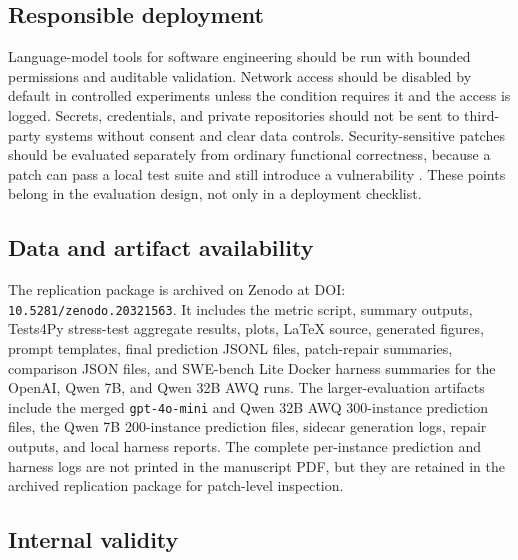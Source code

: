 \documentclass[preprint,12pt]{elsarticle}
\begin{document}
\subsection{Responsible deployment}

Language-model tools for software engineering should be run with bounded permissions and auditable validation. Network access should be disabled by default in controlled experiments unless the condition requires it and the access is logged. Secrets, credentials, and private repositories should not be sent to third-party systems without consent and clear data controls. Security-sensitive patches should be evaluated separately from ordinary functional correctness, because a patch can pass a local test suite and still introduce a vulnerability \cite{shen2025secrepobench}. These points belong in the evaluation design, not only in a deployment checklist.

\subsection{Data and artifact availability}

The replication package is archived on Zenodo at DOI: \texttt{10.5281/zenodo.20321563}. It includes the metric script, summary outputs, Tests4Py stress-test aggregate results, plots, LaTeX source, generated figures, prompt templates, final prediction JSONL files, patch-repair summaries, comparison JSON files, and SWE-bench Lite Docker harness summaries for the OpenAI, Qwen 7B, and Qwen 32B AWQ runs. The larger-evaluation artifacts include the merged \texttt{gpt-4o-mini} and Qwen 32B AWQ 300-instance prediction files, the Qwen 7B 200-instance prediction files, sidecar generation logs, repair outputs, and local harness reports. The complete per-instance prediction and harness logs are not printed in the manuscript PDF, but they are retained in the archived replication package for patch-level inspection.

\subsection{Internal validity}
\end{document}
